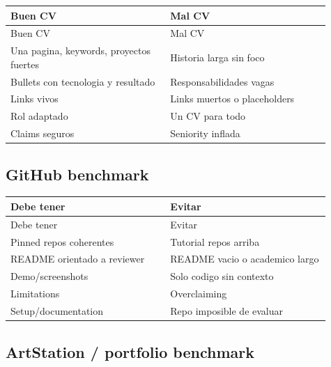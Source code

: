 \begin{center}
\scriptsize
\begin{longtable}{>{\raggedright\arraybackslash}p{0.455\linewidth} >{\raggedright\arraybackslash}p{0.455\linewidth}}
\toprule
Buen CV & Mal CV \\
\midrule
\endfirsthead
\toprule
Buen CV & Mal CV \\
\midrule
\endhead
Una pagina, keywords, proyectos fuertes & Historia larga sin foco \\
Bullets con tecnologia y resultado & Responsabilidades vagas \\
Links vivos & Links muertos o placeholders \\
Rol adaptado & Un CV para todo \\
Claims seguros & Seniority inflada \\
\bottomrule
\end{longtable}
\end{center}


\subsection{GitHub benchmark}


\begin{center}
\scriptsize
\begin{longtable}{>{\raggedright\arraybackslash}p{0.455\linewidth} >{\raggedright\arraybackslash}p{0.455\linewidth}}
\toprule
Debe tener & Evitar \\
\midrule
\endfirsthead
\toprule
Debe tener & Evitar \\
\midrule
\endhead
Pinned repos coherentes & Tutorial repos arriba \\
README orientado a reviewer & README vacio o academico largo \\
Demo/screenshots & Solo codigo sin contexto \\
Limitations & Overclaiming \\
Setup/documentation & Repo imposible de evaluar \\
\bottomrule
\end{longtable}
\end{center}


\subsection{ArtStation / portfolio benchmark}


